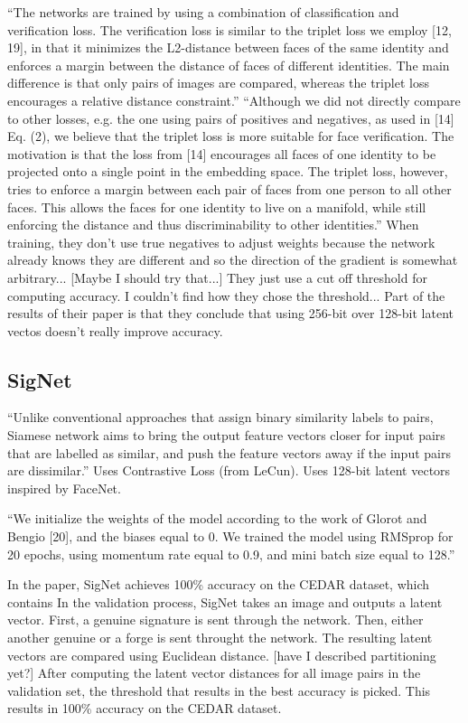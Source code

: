 ``The networks are trained by using a combination of classification and verification loss. The verification
loss is similar to the triplet loss we employ [12, 19], in that it
minimizes the L2-distance between faces of the same identity and enforces a margin between the distance of faces of
different identities. The main difference is that only pairs of
images are compared, whereas the triplet loss encourages a
relative distance constraint.''
``Although we did not directly compare to other losses,
e.g. the one using pairs of positives and negatives, as used
in [14] Eq. (2), we believe that the triplet loss is more suitable for face verification. The motivation is that the loss
from [14] encourages all faces of one identity to be projected onto a single point in the embedding space. The
triplet loss, however, tries to enforce a margin between each
pair of faces from one person to all other faces. This allows the faces for one identity to live on a manifold, while
still enforcing the distance and thus discriminability to other
identities.''
When training, they don't use true negatives to adjust weights because the network already knows they are different and so the direction of the gradient is somewhat arbitrary...
[Maybe I should try that...]
They just use a cut off threshold for computing accuracy.
I couldn't find how they chose the threshold...
Part of the results of their paper is that they conclude that using 256-bit over 128-bit latent vectos doesn't really improve accuracy.

\subsection{SigNet}
``Unlike conventional approaches that assign
binary similarity labels to pairs, Siamese network aims to bring
the output feature vectors closer for input pairs that are labelled
as similar, and push the feature vectors away if the input pairs
are dissimilar.''
Uses Contrastive Loss (from LeCun).
Uses 128-bit latent vectors inspired by FaceNet.

``We initialize the weights of the model according to the work
of Glorot and Bengio [20], and the biases equal to 0. We trained
the model using RMSprop for 20 epochs, using momentum rate
equal to 0.9, and mini batch size equal to 128.''

In the paper, SigNet achieves 100\% accuracy on the CEDAR dataset, which contains 
In the validation process, SigNet takes an image and outputs a latent vector.
First, a genuine signature is sent through the network.
Then, either another genuine or a forge is sent throught the network.
The resulting latent vectors are compared using Euclidean distance.
[have I described partitioning yet?]
After computing the latent vector distances for all image pairs in the validation set, the threshold that results in the best accuracy is picked.
This results in 100\% accuracy on the CEDAR dataset.

